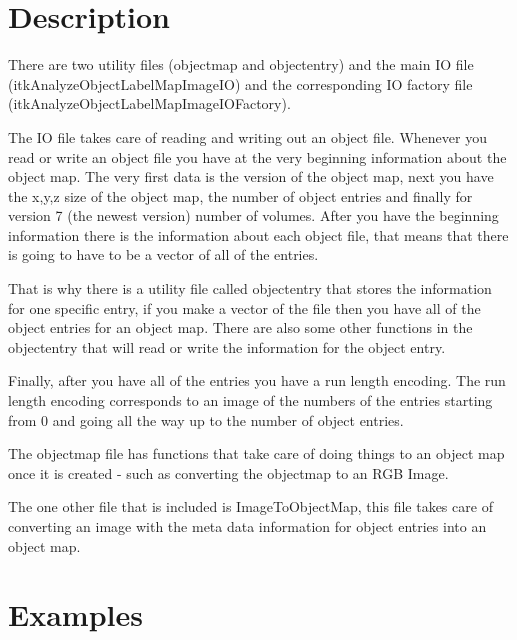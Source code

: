 \documentclass{InsightArticle}
\begin{document}
\section{Description}
There are two utility files (objectmap and objectentry) and the main IO file (itkAnalyzeObjectLabelMapImageIO) and the corresponding
IO factory file (itkAnalyzeObjectLabelMapImageIOFactory).  

The IO file takes care of reading and writing out an object file.  Whenever
you read or write an object file you have at the very beginning information about the object map.  The very first data is the version
of the object map, next you have the x,y,z size of the object map, the number of object entries and finally for version 7 (the newest
version) number of volumes.  After you have the beginning information there is the information about each object file, that means that
there is going to have to be a vector of all of the entries.  

That is why there is a utility file called objectentry that stores the
information for one specific entry, if you make a vector of the file then you have all of the object entries for an object map.  There
are also some other functions in the objectentry that will read or write the information for the object entry.  

Finally, after you have all of the entries you have a run length encoding.  The run length encoding corresponds to an image of the numbers of the entries starting from 0 and going all the way up to the number of object entries.  

The objectmap file has functions that take care of doing things to an object map once it is created - such as converting the objectmap to an RGB Image. 

The one other file that is included is ImageToObjectMap, this file takes care of converting an image with the meta data information for object entries into an object map.

\section{Examples}
\end{document}
